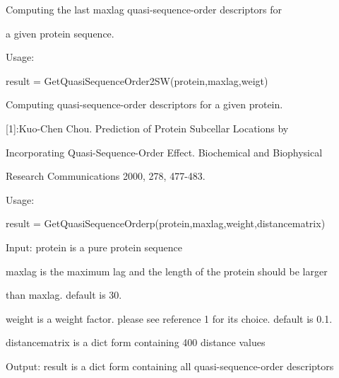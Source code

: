 \documentclass[letterpaper,10pt,english]{sphinxmanual}
\begin{document}

\begin{fulllineitems}
\label{reference/QuasiSequenceOrder:QuasiSequenceOrder.GetQuasiSequenceOrder2SW}
Computing the last maxlag quasi-sequence-order descriptors for

a given protein sequence.

Usage:

result = GetQuasiSequenceOrder2SW(protein,maxlag,weigt)

\end{fulllineitems}


\begin{fulllineitems}
\label{reference/QuasiSequenceOrder:QuasiSequenceOrder.GetQuasiSequenceOrderp}
Computing quasi-sequence-order descriptors for a given protein.

{[}1{]}:Kuo-Chen Chou. Prediction of Protein Subcellar Locations by

Incorporating Quasi-Sequence-Order Effect. Biochemical and Biophysical

Research Communications 2000, 278, 477-483.

Usage:

result = GetQuasiSequenceOrderp(protein,maxlag,weight,distancematrix)

Input: protein is a pure protein sequence

maxlag is the maximum lag and the length of the protein should be larger

than maxlag. default is 30.

weight is a weight factor.  please see reference 1 for its choice. default is 0.1.

distancematrix is a dict form containing 400 distance values

Output: result is a dict form containing all quasi-sequence-order descriptors

\end{fulllineitems}
\end{document}
